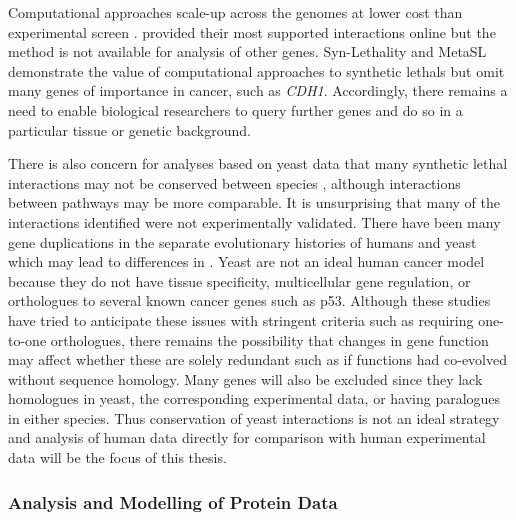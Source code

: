 Computational approaches scale-up across the \glspl{genome} at lower cost than experimental screen \citep{Wu2014}. \citet{Wu2014} provided their most supported interactions online but the method is not available for analysis of other genes.  %
Syn-Lethality \citep{Li2014} and MetaSL \citep{Wu2014} demonstrate the value of computational approaches to \glspl{synthetic lethal} but omit many genes of importance in cancer, such as \textit{CDH1}. Accordingly, there remains a need to enable biological researchers to query further genes and do so in a particular tissue or genetic background. 

There is also concern for analyses based on yeast data that many \gls{synthetic lethal} interactions may not be conserved between species \citet{Dixon2009a}, although interactions between \glspl{pathway} may be more comparable. It is unsurprising that many of the interactions identified were not experimentally validated. There have been many gene duplications in the separate evolutionary histories of humans and yeast which may lead to differences in . Yeast are not an ideal human cancer model because they do not have tissue specificity, multicellular gene regulation, or orthologues to several known \glspl{cancer gene} such as p53. Although these studies have tried to anticipate these issues with stringent criteria such as requiring one-to-one orthologues, there remains the possibility that changes in gene function may affect whether these are solely redundant such as if functions had co-evolved without sequence homology. Many genes will also be excluded since they lack homologues in yeast, the corresponding experimental data, or having paralogues in either species. Thus conservation of yeast interactions is not an ideal strategy and analysis of human data directly for comparison with human experimental data will be the focus of this thesis. 

\subsubsection{Analysis and Modelling of Protein Data}

